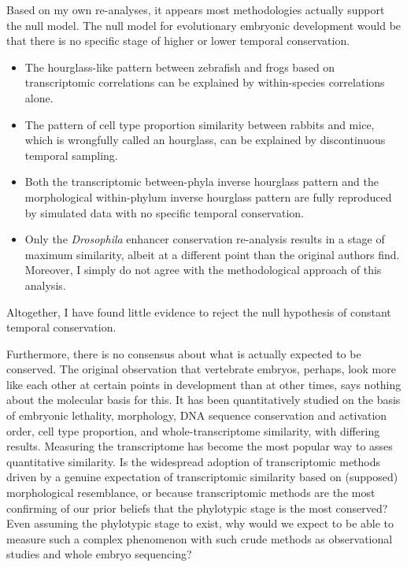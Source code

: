 Based on my own re-analyses, it appears most methodologies actually support the null model. The null model for evolutionary embryonic development would be that there is no specific stage of higher or lower temporal conservation. 
\begin{itemize}
    \item The hourglass-like pattern between zebrafish and frogs based on transcriptomic correlations can be explained by within-species correlations alone.
    \item The pattern of cell type proportion similarity between rabbits and mice, which is wrongfully called an hourglass, can be explained by discontinuous temporal sampling.
    \item Both the transcriptomic between-phyla inverse hourglass pattern and the morphological within-phylum inverse hourglass pattern are fully reproduced by simulated data with no specific temporal conservation.
    \item Only the \textit{Drosophila} enhancer conservation re-analysis results in a stage of maximum similarity, albeit at a different point than the original authors find. Moreover, I simply do not agree with the methodological approach of this analysis.
\end{itemize}
Altogether, I have found little evidence to reject the null hypothesis of constant temporal conservation.

Furthermore, there is no consensus about what is actually expected to be conserved. The original observation that vertebrate embryos, perhaps, look more like each other at certain points in development than at other times, says nothing about the molecular basis for this. It has been quantitatively studied on the basis of embryonic lethality\cite{Uchida2018}, morphology\cite{OlafRP2003,Cordero2020}, DNA sequence conservation\cite{Piasecka2013,Quint2012,Liu2021} and activation order\cite{Uesaka2019}, cell type proportion\cite{Mayshar2023}, and whole-transcriptome similarity\cite{Piasecka2013,Irie2011,marletaz2018,Liu2020,Leong2021,PerezPosada2022,Kalinka2010}, with differing results. Measuring the transcriptome has become the most popular way to asses quantitative similarity. Is the widespread adoption of transcriptomic methods driven by a genuine expectation of transcriptomic similarity based on (supposed) morphological resemblance, or because transcriptomic methods are the most confirming of our prior beliefs that the phylotypic stage is the most conserved? Even assuming the phylotypic stage to exist, why would we expect to be able to measure such a complex phenomenon with such crude methods as observational studies and whole embryo sequencing?

